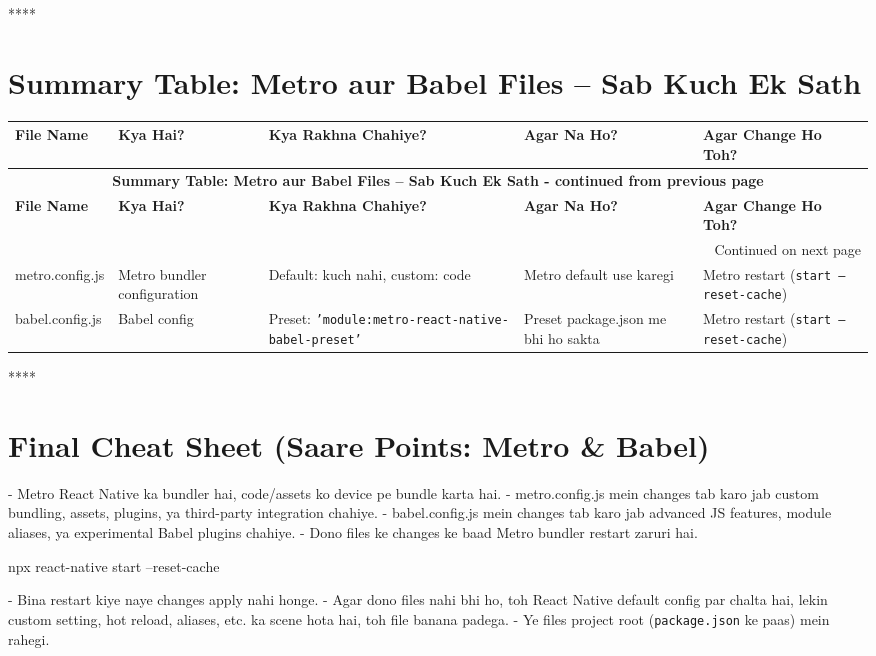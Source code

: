 \documentclass[a4paper]{article}
\newcommand\imp[1]{{\color{ImportantRed}#1}}
\begin{document}
{****
\section*{Summary Table: Metro aur Babel Files – Sab Kuch Ek Sath}

\small %
\begin{center}
\begin{longtable}{|p{2.5cm}|p{3cm}|p{3cm}|p{3cm}|p{3cm}|}
\hline
\textbf{File Name}         & \textbf{Kya Hai?}                       & \textbf{Kya Rakhna Chahiye?}                    & \textbf{Agar Na Ho?}                & \textbf{Agar Change Ho Toh?}                \\
\hline
\endfirsthead
\multicolumn{5}{c}{{\bfseries Summary Table: Metro aur Babel Files – Sab Kuch Ek Sath - continued from previous page}} \\
\hline
\textbf{File Name}         & \textbf{Kya Hai?}                       & \textbf{Kya Rakhna Chahiye?}                    & \textbf{Agar Na Ho?}                & \textbf{Agar Change Ho Toh?}                \\
\hline
\endhead
\hline
\multicolumn{5}{|r|}{{Continued on next page}} \\
\hline
\endfoot
\hline
\endlastfoot

metro.config.js   & Metro bundler configuration   & Default: kuch nahi, custom: code       & Metro default use karegi  & Metro restart (\texttt{start --reset-cache}) \\
\hline
babel.config.js   & Babel config                  & Preset: \texttt{'module:metro-react-native-babel-preset'} & Preset package.json me bhi ho sakta & Metro restart (\texttt{start --reset-cache}) \\
\hline
\end{longtable}
\end{center}
\vspace{1em}

****
\section*{Final Cheat Sheet (Saare Points: Metro \& Babel)}
- \imp{Metro} React Native ka bundler hai, code/assets ko device pe bundle karta hai.
- \imp{metro.config.js} mein changes tab karo jab custom bundling, assets, plugins, ya third-party integration chahiye.
- \imp{babel.config.js} mein changes tab karo jab advanced JS features, module aliases, ya experimental Babel plugins chahiye.
- \imp{Dono files ke changes ke baad Metro bundler restart zaruri hai.}\\
\begin{codeblock}
npx react-native start --reset-cache
\end{codeblock}
- \imp{Bina restart kiye naye changes apply nahi honge.}
- \imp{Agar dono files nahi bhi ho, toh React Native default config par chalta hai, lekin custom setting, hot reload, aliases, etc. ka scene hota hai, toh file banana padega.}
- \imp{Ye files project root (\texttt{package.json} ke paas) mein rahegi.}

}
\end{document}

